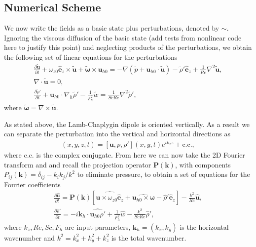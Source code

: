 \subsection{Numerical Scheme}
We now write the fields as a basic state plus perturbations, denoted by $\sim$. Ignoring the viscous diffusion of the basic state \cite{drazinreid} (add tests from nonlinear code here to justify this point) and neglecting products of the perturbations, we obtain the following set of linear equations for the perturbations
\begin{align}
\frac{\partial \tilde{\bm{u}}}{\partial t} + \omega_{z0}\hat{\bm{e}}_{z}\times \tilde{\bm{u}}+\tilde{\boldsymbol{\omega}}\times \bm{u}_{h0} = -\nabla(\tilde{p}+\bm{u}_{h0} \cdot \tilde{\bm{u}}) - \tilde{\rho}'\hat{\bm{e}}_{z} + \frac{1}{Re}\nabla^{2}\tilde{\bm{u}},\label{nsl1}\\
\nabla\cdot\tilde{\bm{u}}=0,\\
\frac{\partial \tilde{\rho}'}{\partial t} + \bm{u}_{h0}\cdot \nabla_{h}\tilde{\rho}'-\frac{1}{F_{h}^{2}}\tilde{w} = \frac{1}{ScRe}\nabla^{2}\tilde{\rho}',\label{nsl3}
\end{align}
where $\tilde{\boldsymbol{\omega}}=\nabla \times \tilde{\bm{u}}$.

As stated above, the Lamb-Chaplygin dipole is oriented vertically. As a result we can separate the perturbation into the vertical and horizontal directions as 
\begin{align} 
[\tilde{\bm{u}},\tilde{p},\tilde{\rho}'](x,y,z,t) = [\bm{u},p,\rho'](x,y,t)e^{ik_{z}z} + \text{c.c.},
\end{align}
where c.c. is the complex conjugate. From here we can now take the 2D Fourier transform and and recall the projection operator $\textbf{P}(\textbf{k})$, with components $P_{ij}(\textbf{k})=\delta_{ij} - k_{i}k_{j}/k^{2}$ to eliminate pressure, to obtain a set of equations for the Fourier coefficients 
\begin{align}
\frac{\partial \hat{\bm{u}}}{\partial t} = \textbf{P}(\textbf{k})[\widehat{\bm{u}\times \omega_{z0}\hat{\bm{e}}_{z}} + \widehat{\bm{u}_{h0}\times\bm{\omega}}-\hat{\rho}'\hat{\bm{e}}_{z}] - \frac{k^{2}}{Re}\hat{\bm{u}},\label{solve1}\\
\frac{\partial\hat{\rho}'}{\partial t} = -i\bm{k}_{h}\cdot\widehat{\bm{u}_{h0}\rho'} + \frac{1}{F_{h}^{2}}\hat{w}- \frac{k^{2}}{ScRe}\hat{\rho}',\label{solve2}
\end{align}
where $k_{z},Re,Sc,F_{h}$ are input parameters, $\bm{k}_{h}=(k_{x},k_{y})$ is the horizontal wavenumber and $k^{2}=k_{x}^{2}+k_{y}^{2}+k_{z}^{2}$ is the total wavenumber. 

